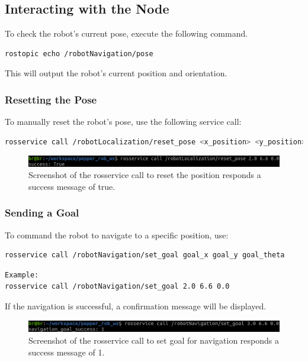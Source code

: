 \documentclass{CSSRforAfrica}
\begin{document}
\subsection{Interacting with the Node}
\noindent To check the robot's current pose, execute the following command.
\begin{lstlisting}[style=withoutNumbering, language=bash]
rostopic echo /robotNavigation/pose
\end{lstlisting}
\noindent This will output the robot’s current position and orientation.

\subsubsection*{Resetting the Pose}
To manually reset the robot’s pose, use the following service call:
\begin{lstlisting}[style=withoutNumbering, language=bash]
rosservice call /robotLocalization/reset_pose <x_position> <y_position> <theta>
\end{lstlisting}
\begin{figure}[H]
    \centering
    \includegraphics[width=\linewidth]{Images/reset_pose.png}
    \caption{Screenshot of the rosservice call to reset the position responds a success message of true.}
    \label{fig:reset_pose}
\end{figure}
\subsubsection*{Sending a Goal}
To command the robot to navigate to a specific position, use:
\begin{lstlisting}[style=withoutNumbering, language=bash]
rosservice call /robotNavigation/set_goal goal_x goal_y goal_theta
\end{lstlisting}
\begin{lstlisting}[style=withoutNumbering, language=bash]
Example:
rosservice call /robotNavigation/set_goal 2.0 6.6 0.0
\end{lstlisting}
If the navigation is successful, a confirmation message will be displayed.
\begin{figure}[H]
    \centering
    \includegraphics[width=\linewidth]{Images/set_goal.png}
    \caption{Screenshot of the rosservice call to set goal for navigation responds a success message of 1.}
    \label{fig:set_goal}
\end{figure}
\end{document}
